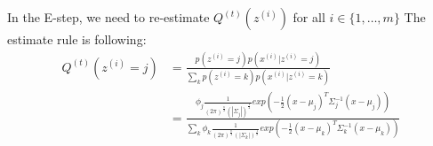 \begin{answer}
In the E-step, we need to re-estimate $Q^{(t)}(z^{(i)})$ for all $i \in \{1,\ldots,m\}$
The estimate rule is following:
\begin{align*}
    Q^{(t)}(z^{(i)}=j) &= \frac{p(z^{(i)}=j) p(x^{(i)}| z^{(i)}=j)}{\sum_k p(z^{(i)}=k) p(x^{(i)}| z^{(i)}=k)}\\
    &= \frac{\phi_j \frac{1}{(2\pi)^{\frac{n}{2}} (|\Sigma_j|)^{\frac{1}{2}}} exp(-\frac{1}{2}(x-\mu_j)^T \Sigma_j^{-1}(x-\mu_j))}{\sum_k \phi_k \frac{1}{(2\pi)^{\frac{n}{2}} (|\Sigma_k|)^{\frac{1}{2}}} exp(-\frac{1}{2}(x-\mu_k)^T \Sigma_k^{-1}(x-\mu_k))}
\end{align*}
\end{answer}
